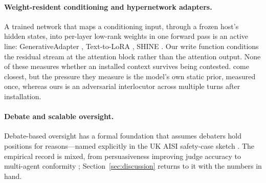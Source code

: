 \paragraph{Weight-resident conditioning and hypernetwork adapters.} A trained network that
maps a conditioning input, through a frozen host's hidden states, into per-layer low-rank
weights in one forward pass is an active line: GenerativeAdapter
\citep{chen2025generativeadapter}, Text-to-LoRA \citep{charakorn2025texttolora}, SHINE
\citep{liu2026shine}. Our write function conditions the residual stream at the attention block rather than
the attention output. None of these measures whether an installed context survives being
contested. \citet{cheng2026overridegap} come closest, but the pressure they measure is the
model's own static prior, measured once, whereas ours is an adversarial interlocutor across
multiple turns after installation.

\paragraph{Debate and scalable oversight.} Debate-based oversight has a formal foundation
\citep{irving2018debate, browncohen2023doublyefficient} that assumes debaters hold positions
for reasons---named explicitly in the UK AISI safety-case sketch \citep{buhl2025aisi}. The
empirical record is mixed, from persuasiveness improving judge accuracy
\citep{khan2024persuasive} to multi-agent conformity \citep{bertalanic2026costofconsensus};
Section~\ref{sec:discussion} returns to it with the numbers in hand.

